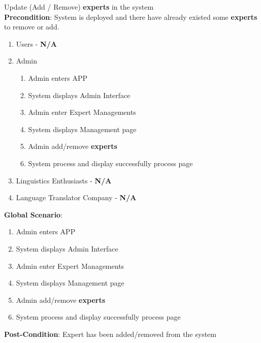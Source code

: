 \item Update (Add / Remove) \textbf{experts} in the system 
	\\ \textbf{Precondition}: System is deployed and there have already existed some \textbf{experts} to remove or add.
	\begin{enumerate}[{\bf VP1.}]
		\item Users - \textbf{N/A}
		\item Admin
		\begin{enumerate}[{\bf 1.}]
			\item Admin enters APP
			\item System displays Admin Interface
			\item Admin enter Expert Managements
			\item System displays Management page
			\item Admin add/remove \textbf{experts}
			\item System process and display successfully process page

		\end{enumerate}
		\item Linguistics Enthusiasts - \textbf{N/A}
		\item Language Translator Company - \textbf{N/A}
	\end{enumerate}
	\textbf{Global Scenario}:
	\begin{enumerate}[{\bf 1.}]
		\item Admin enters APP
		\item System displays Admin Interface
		\item Admin enter Expert Managements
		\item System displays Management page
		\item Admin add/remove \textbf{experts}
		\item System process and display successfully process page

	\end{enumerate}
	\textbf{Post-Condition}: Expert has been added/removed from the system
